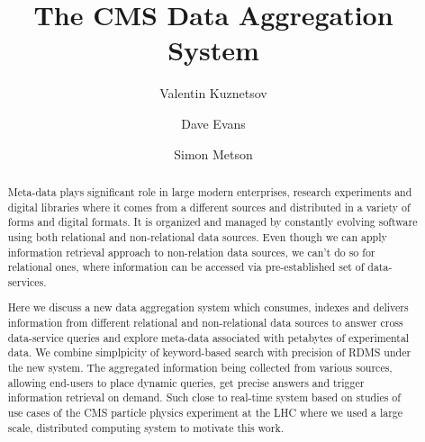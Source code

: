 \documentclass[a4paper]{jpconf}
\begin{document}
\title{The CMS Data Aggregation System}

\author{Valentin Kuznetsov}
\address{Cornell University, Ithaca, New York, USA}

\author{Dave Evans}
\address{Fermilab, Batavia, Illinois, USA}

\author{Simon Metson}
\address{Bristol University, Bristol, UK}

\begin{abstract}
Meta-data plays signiﬁcant role in large modern enterprises, 
research experiments and digital libraries where it comes from a different 
sources and distributed in a variety of forms and digital formats. 
It is organized and managed by constantly evolving software using 
both relational and non-relational data sources. Even though we can apply
information retrieval approach to non-relation data sources,
we can't do so for relational ones, where information can be accessed via
pre-established set of data-services.

Here we discuss a new data aggregation system which consumes, 
indexes and delivers information from different relational and 
non-relational data sources to answer cross data-service queries 
and explore meta-data associated with petabytes of experimental data. 
We combine simplpicity of keyword-based search with precision of RDMS
under the new system. The aggregated information being collected from various sources,
allowing end-users to place dynamic queries, get precise answers and 
trigger information retrieval on demand. Such close to real-time system 
based on studies  of use cases of the CMS particle physics experiment at 
the LHC where we used a large scale, distributed computing system 
to motivate this work.

\end{abstract}

\newpage
\end{document}
